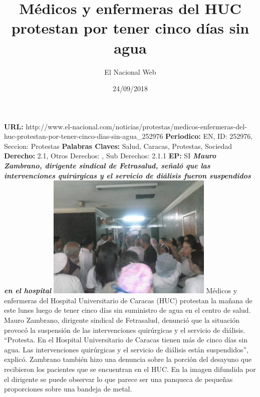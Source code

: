 \documentclass{article}%
\title{\textbf{Médicos y enfermeras del HUC protestan por tener cinco días sin agua}}%
\author{El Nacional Web}%
\date{24/09/2018}%
\begin{document}
%
\normalsize%
\maketitle%
\textbf{URL: }%
http://www.el{-}nacional.com/noticias/protestas/medicos{-}enfermeras{-}del{-}huc{-}protestan{-}por{-}tener{-}cinco{-}dias{-}sin{-}agua\_252976\newline%
%
\textbf{Periodico: }%
EN, %
ID: %
252976, %
Seccion: %
Protestas\newline%
%
\textbf{Palabras Claves: }%
Salud, Caracas, Protestas, Sociedad\newline%
%
\textbf{Derecho: }%
2.1, %
Otros Derechos: %
, %
Sub Derechos: %
2.1.1\newline%
%
\textbf{EP: }%
SI\newline%
\newline%
%
\textbf{\textit{Mauro Zambrano, dirigente sindical de Fetrasalud, señaló que las intervenciones quirúrgicas y el servicio de diálisis fueron suspendidos en el hospital}}%
\newline%
\newline%
%
\includegraphics[width=300px]{47.jpg}%
\newline%
%
Médicos y enfermeras del Hospital Universitario de Caracas (HUC) protestan la mañana de este lunes luego de tener cinco días sin suministro de agua en el centro de salud.%
\newline%
%
Mauro Zambrano, dirigente sindical de Fetrasalud, denunció que la situación provocó la suspensión de las intervenciones quirúrgicas y el servicio de diálisis.%
\newline%
%
“Protesta. En el Hospital Universitario de Caracas tienen más de cinco días sin agua. Las intervenciones quirúrgicas y el servicio de diálisis están suspendidos”, explicó.%
\newline%
%
Zambrano también hizo una denuncia sobre la porción del desayuno que recibieron los pacientes que se encuentran en el HUC. En la imagen difundida por el dirigente se puede observar lo que parece ser una panqueca de pequeñas proporciones sobre una bandeja de metal.%
\newline%
%
\end{document}
